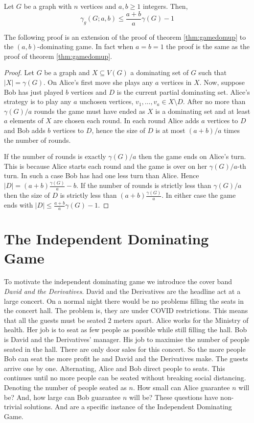 \begin{theorem}[Askes] 
    Let $G$ be a graph with $n$ vertices and $a,b\geq1$ integers. Then,
    \[\gamma_{g}(G;a,b) \leq \frac{a+b}{a}\gamma(G) - 1\]
\end{theorem}
    The following proof is an extension of the proof of theorem \ref{thm:gamedomup} to the $(a,b)$-dominating game. In fact when $a=b=1$ the proof is the same as the proof of theorem \ref{thm:gamedomup}.
\begin{proof}    
   Let $G$ be a graph and $X\subseteq V(G)$ a dominating set of $G$ such that $|X| = \gamma(G)$. On Alice's first move she plays any $a$ vertices in $X$. Now, suppose Bob has just played $b$ vertices and $D$ is the current partial dominating set. Alice's strategy is to play any $a$ unchosen vertices, $v_1,\dots,v_a \in X\setminus D$. After no more than $\gamma(G)/a$ rounds the game must have ended as $X$ is a dominating set and at least $a$ elements of $X$ are chosen each round. In each round Alice adds $a$ vertices to $D$ and Bob adds $b$ vertices to $D$, hence the size of $D$ is at most $(a+b)/a$ times the number of rounds. 
   
   If the number of rounds is exactly $\gamma(G)/a$ then the game ends on Alice's turn. This is because Alice starts each round and the game is over on her $\gamma(G)/a$-th turn. In such a case Bob has had one less turn than Alice. Hence $|D|=(a+b)\frac{\gamma(G)}{a} -b$. If the number of rounds is strictly less than $\gamma(G)/a$ then the size of $D$ is strictly less than $(a+b)\frac{\gamma(G)}{a}$. In either case the game ends with $|D| \leq \frac{a+b}{a}\gamma(G) - 1$.
\end{proof}

\section{The Independent Dominating Game} \label{sec:ind_dom_game}

To motivate the independent dominating game we introduce the cover band \textit{David and the Derivatives}. David and the Derivatives are the headline act at a large concert. On a normal night there would be no problems filling the seats in the concert hall. The problem is, they are under COVID restrictions. This means that all the guests must be seated 2 meters apart. Alice works for the Ministry of health. Her job is to seat as few people as possible while still filling the hall. Bob is David and the Derivatives' manager. His job to maximise the number of people seated in the hall. There are only door sales for this concert. So the more people Bob can seat the more profit he and David and the Derivatives make. The guests arrive one by one. Alternating, Alice and Bob direct people to seats. This continues until no more people can be seated without breaking social distancing. Denoting the number of people seated as $n$. How small can Alice guarantee $n$ will be? And, how large can Bob guarantee $n$ will be? These questions have non-trivial solutions. And are a specific instance of the Independent Dominating Game.

